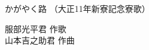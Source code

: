 \documentclass[10pt,b5j]{tarticle} %
\begin{document}
\begin{minipage}[c]{0.7\hsize} %
    \begin{center}
        {\LARGE
            かがやく路 %
        }
        {\small 
            （大正11年新寮記念寮歌） %
        }
    \end{center}
\end{minipage}
\begin{minipage}[c]{0.3\hsize} %
    \begin{flushright} %
        服部光平君 作歌\\山本吉之助君 作曲 %
    \end{flushright}
\end{minipage}
\end{document}

